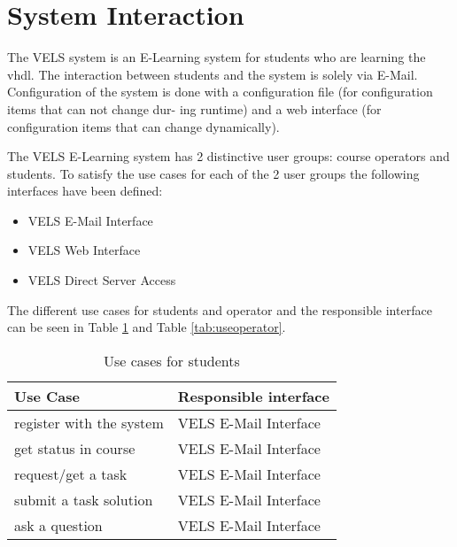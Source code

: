 \section{System Interaction} \label{system_interaction}
The VELS system is an E-Learning system for students who are learning the \gls{vhdl}. The
interaction between students and the system is solely via E-Mail. Configuration of the
system is done with a configuration file (for configuration items that can not change dur-
ing runtime) and a web interface (for configuration items that can change dynamically).

The VELS E-Learning system has 2 distinctive user groups: course operators and students.
To satisfy the use cases for each of the 2 user groups the following interfaces have
been defined:
\begin{itemize}
\item VELS E-Mail Interface
\item VELS Web Interface
\item VELS Direct Server Access
\end{itemize}

The different use cases for students and operator and the responsible interface can be
seen in Table \ref{tab:usestudent} and Table \ref{tab:useoperator}.

\begin{table}[h]
\centering
\begin{tabular}{||l | l||}
    \hline
    Use Case & Responsible interface \\ [0.5ex]
    \hline\hline
    register with the system & VELS E-Mail Interface
    \\
    \hline
    get status in course & VELS E-Mail Interface
    \\
    \hline
    request/get a task & VELS E-Mail Interface
    \\
    \hline
    submit a task solution & VELS E-Mail Interface
    \\
    \hline
    ask a question & VELS E-Mail Interface
    \\
    \hline
\end{tabular}
\caption{Use cases for students}
\label{tab:usestudent}
\end{table}


